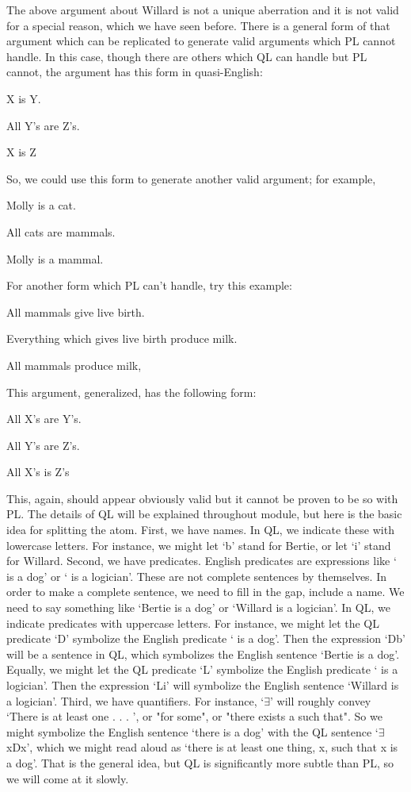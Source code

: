 The above argument about Willard is not a unique aberration and it is not valid for a special reason, which we have seen before. There is a general form of that argument which can be replicated to generate valid arguments which PL cannot handle. In this case, though there are others which QL can handle but PL cannot, the argument has this form in quasi-English:
\begin{earg}
\item[]X is Y.
\item[]All Y's are Z's.
\item[\therefore]  X is Z
\end{earg}
So, we could use this form to generate another valid argument; for example,
\begin{earg}
\item[]Molly is a cat.
\item[]All cats are mammals.
\item[\therefore]  Molly is a mammal.
\end{earg}
For another form which PL can't handle, try this example:
\begin{earg}
\item[]All mammals give live birth.
\item[]Everything which gives live birth produce milk.
\item[\therefore]  All mammals produce milk,
\end{earg}
This argument, generalized, has the following form:
\begin{earg}
\item[]All X's are Y's.
\item[]All Y's are Z's.
\item[\therefore]  All X's is Z's
\end{earg}
This, again, should appear obviously valid but it cannot be proven to be so with PL. The details of QL will be explained throughout module, but here is the basic idea for splitting the atom. First, we have names. In QL, we indicate these with lowercase letters. For instance, we might let ‘b’ stand for Bertie, or let ‘i’ stand for Willard. Second, we have predicates. English predicates are expressions like ‘ is a dog’ or ‘ is a logician’. These are not complete sentences by themselves. In order to make a complete sentence, we need to fill in the gap, include a name. We need to say something like ‘Bertie is a dog’ or ‘Willard is a logician’. In QL, we indicate predicates with uppercase letters. For instance, we might let the QL predicate ‘D’ symbolize the English predicate ‘ is a dog’. Then the expression ‘Db’ will be a sentence in QL, which symbolizes the English sentence ‘Bertie is a dog’. Equally, we might let the QL predicate ‘L’ symbolize the English predicate ‘ is a logician’. Then the expression ‘Li’ will symbolize the English sentence ‘Willard is a logician’. Third, we have quantifiers. For instance, ‘$\exists$’ will roughly convey ‘There is at least one . . . ’, or "for some", or "there exists a \blank such that". So we might symbolize the English sentence ‘there is a dog’ with the QL sentence ‘$\exists$xDx’, which we might read aloud as ‘there is at least one thing, x, such that x is a dog’. That is the general idea, but QL is significantly more subtle than PL, so we will come at it slowly.

